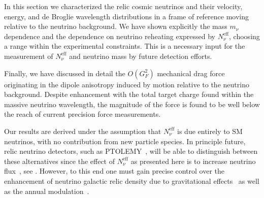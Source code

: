 In this section we characterized the relic cosmic neutrinos and their velocity, energy, and de Broglie wavelength distributions in a frame of reference moving relative to the neutrino background. We have shown explicitly the mass $m_\nu$ dependence and the dependence on neutrino reheating expressed by $N_\nu^{\mathrm{eff}}$, choosing a range within the experimental constraints. This is a necessary input for the measurement of $N_\nu^{\mathrm{eff}}$ and neutrino mass by future detection efforts.  

Finally, we have discussed in detail the $O(G_F^2)$ mechanical drag force  originating in the dipole anisotropy induced by motion relative to the neutrino background.  Despite enhancement with the total target charge found within the massive neutrino wavelength, the magnitude of the force is found to be well below the reach of current  precision force measurements.

Our results are derived under the assumption that $N_\nu^{\mathrm{eff}}$ is due entirely to SM neutrinos, with no contribution from new particle species. In principle future, relic neutrino detectors, such as PTOLEMY~\cite{Betts:2013uya}, will be able to distinguish between these alternatives since the effect of $N_\nu^{\mathrm{eff}}$ as presented here is to increase neutrino flux~\cite{Birrell:2012gg}, see . However, to this end one must gain precise control over the enhancement of neutrino galactic relic density due to  gravitational effects~\cite{Ringwald:2004np} as well as the annual modulation~\cite{Safdi:2014rza}. 
